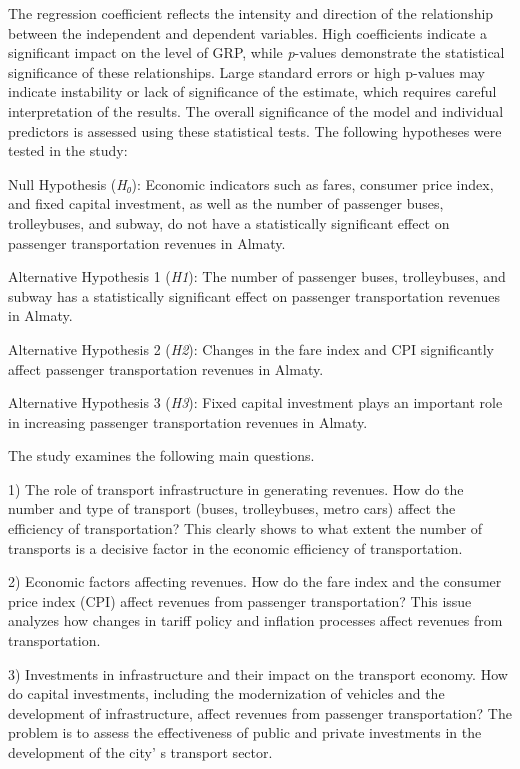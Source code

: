 The regression coefficient reflects the intensity and direction of the
relationship between the independent and dependent variables. High
coefficients indicate a significant impact on the level of GRP, while
\emph{p}-values \hspace{0pt}\hspace{0pt}demonstrate the statistical
significance of these relationships. Large standard errors or high
p-values \hspace{0pt}\hspace{0pt}may indicate instability or lack of
significance of the estimate, which requires careful interpretation of
the results. The overall significance of the model and individual
predictors is assessed using these statistical tests. The following
hypotheses were tested in the study:

Null Hypothesis (\emph{H₀}): Economic indicators such as fares, consumer
price index, and fixed capital investment, as well as the number of
passenger buses, trolleybuses, and subway, do not have a statistically
significant effect on passenger transportation revenues in Almaty.

Alternative Hypothesis 1 (\emph{H1}): The number of passenger buses,
trolleybuses, and subway has a statistically significant effect on
passenger transportation revenues in Almaty.

Alternative Hypothesis 2 (\emph{H2}): Changes in the fare index and CPI
significantly affect passenger transportation revenues in Almaty.

Alternative Hypothesis 3 (\emph{H3}): Fixed capital investment plays an
important role in increasing passenger transportation revenues in
Almaty.

The study examines the following main questions.

1) The role of transport infrastructure in generating revenues. How do
the number and type of transport (buses, trolleybuses, metro cars)
affect the efficiency of transportation? This clearly shows to what
extent the number of transports is a decisive factor in the economic
efficiency of transportation.

2) Economic factors affecting revenues. How do the fare index and the
consumer price index (CPI) affect revenues from passenger
transportation? This issue analyzes how changes in tariff policy and
inflation processes affect revenues from transportation.

3) Investments in infrastructure and their impact on the transport
economy. How do capital investments, including the modernization of
vehicles and the development of infrastructure, affect revenues from
passenger transportation? The problem is to assess the effectiveness of
public and private investments in the development of the
city' s transport sector.

